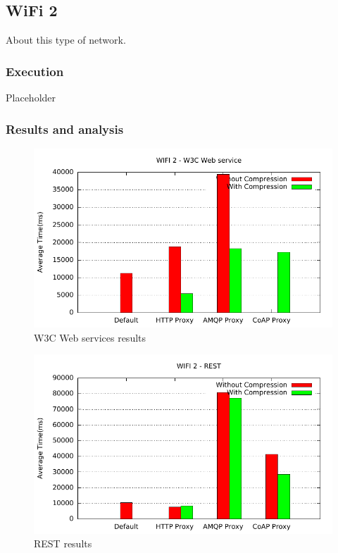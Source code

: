 \subsection{WiFi 2}

About this type of network.

\subsubsection{Execution}
Placeholder

\subsubsection{Results and analysis}

\begin{figure}[H]
\center
\includegraphics[scale=0.75]{../results/wifi2/nffi/out.pdf}
\caption{W3C Web services results}
\end{figure}

\begin{figure}[H]
\center
\includegraphics[scale=0.75]{../results/wifi2/rest/out.pdf}
\caption{REST results}
\end{figure}


